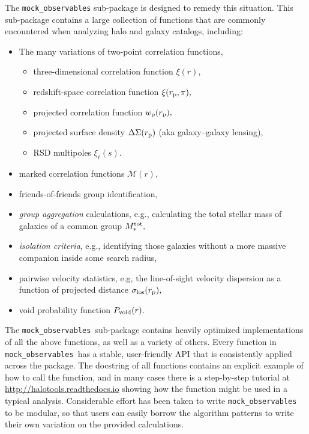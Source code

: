 \documentclass[twocolumn, tighten]{aastex6}
\newcommand{\bit}{\begin{itemize}}
\newcommand{\eit}{\end{itemize}}
\newcommand{\rproj}{r_{\rm p}}
\newcommand{\mockobs}{{\tt mock\_observables }}
\begin{document}
The {\tt mock\_observables} sub-package is designed to remedy this situation. This sub-package contains a large collection of functions that are commonly encountered when analyzing halo and galaxy catalogs, including:

\bit
\item The many variations of two-point correlation functions,
\bit
\item three-dimensional correlation function $\xi(r),$
\item redshift-space correlation function $\xi(\rproj, \pi),$
\item projected correlation function $w_{\rm p}(\rproj),$
\item projected surface density $\Delta\Sigma(r_{\rm p})$ (aka galaxy--galaxy lensing),
\item RSD multipoles $\xi_{\ell}(s).$
\eit
\item marked correlation functions $\mathcal{M}(r),$
\item friends-of-friends group identification,
\item {\em group aggregation} calculations, e.g., calculating the total stellar mass of galaxies of a common group $M_{\ast}^{\rm tot},$
\item {\em isolation criteria}, e.g., identifying those galaxies without a more massive companion inside some search radius,
\item pairwise velocity statistics, e.g, the line-of-sight velocity dispersion as a function of projected distance $\sigma_{\rm los}(\rproj),$
\item void probability function $P_{\rm void}(r).$
\eit

The \mockobs sub-package contains heavily optimized implementations of all the above functions, as well as a variety of others. Every function in \mockobs has a stable, user-friendly API that is consistently applied across the package. The docstring of all functions contains an explicit example of how to call the function, and in many cases there is a step-by-step tutorial at \url{http://halotools.readthedocs.io} showing how the function might be used in a typical analysis. Considerable effort has been taken to write \mockobs to be modular, so that users can easily borrow the algorithm patterns to write their own variation on the provided calculations.
\end{document}
